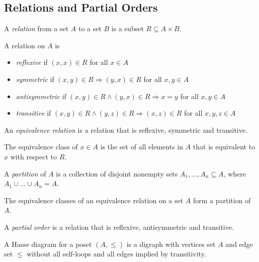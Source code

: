 \documentclass[11pt]{article}
\begin{document}
\subsection{Relations and Partial Orders}

\begin{definition}
A \emph{relation} from a set $A$ to a set $B$ is a subset $R \subseteq A \times B$.
\end{definition}

\begin{definition}
A relation on $A$ is
\begin{itemize}
\item \emph{reflexive} if $(x,x) \in R$ for all $x \in A$
\item \emph{symmetric} if $(x,y) \in R \Rightarrow (y,x) \in R$ for all $x,y \in A$
\item \emph{antisymmetric} if $(x,y) \in R \wedge (y,x) \in R \Rightarrow x = y$ for all
$x,y \in A$
\item \emph{transitive} if $(x,y) \in R \wedge (y,z) \in R \Rightarrow (x,z) \in R$ for all
$x,y,z \in A$
\end{itemize}
\end{definition}

\begin{definition}
An \emph{equivalence relation} is a relation that is reflexive, symmetric and transitive.
\end{definition}

\begin{definition}
The equivalence class of $x \in A$ is the set of all elements in $A$ that is equivalent to $x$ with
respect to $R$.
\end{definition}

\begin{definition}
A \emph{partition} of $A$ is a collection of disjoint nonempty sets $A_1,\dots,A_n \subseteq A$,
where $A_1\cup\dots\cup A_n = A$.
\end{definition}

\begin{theorem}
The equivalence classes of an equivalence relation on a set $A$ form a partition of $A$.
\end{theorem}

\begin{definition}
A \emph{partial order} is a relation that is reflexive, antisymmetric and transitive.
\end{definition}

\begin{definition}
A Hasse diagram for a poset $(A,\leq)$ is a digraph with vertices set $A$ and edge set $\leq$
without all self-loops and all edges implied by transitivity.
\end{definition}
\end{document}
